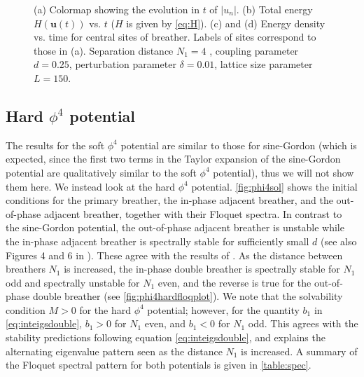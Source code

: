 \documentclass[12pt,reqno]{amsart}
\newcommand{\uvec}{\mathbf{u}}
\theoremstyle{definition}
\begin{document}
\begin{figure}
\begin{center}
\begin{subfigure}{0.45\linewidth}
		\label{fig:timestepSGpplongd}
	\end{subfigure}
	\end{center}
	\caption{(a) Colormap showing the evolution in $t$ of $|u_n|$. (b) Total energy $H(\uvec(t))$ vs. $t$ ($H$ is given by \cref{eq:H}). (c) and (d) Energy density vs. time for central sites of breather. Labels of sites correspond to those in (a). Separation distance $N_1 = 4$
	, coupling parameter $d=0.25$, perturbation parameter $\delta = 0.01$, lattice size parameter $L=150$.}
	\label{fig:timestepSGpplong}
\end{figure}

\subsection{Hard \texorpdfstring{$\phi^4$}{phi-4} potential}

The results for the soft $\phi^4$ potential are similar to those for sine-Gordon (which is expected, since the first two terms in the Taylor expansion of the sine-Gordon potential are qualitatively similar to the soft $\phi^4$ potential), thus we will not show them here. We instead look at the hard $\phi^4$ potential. \cref{fig:phi4sol} shows the initial conditions for the primary breather, the in-phase adjacent breather, and the out-of-phase adjacent breather, together with their Floquet spectra. In contrast to the sine-Gordon potential, the out-of-phase adjacent breather is unstable while the in-phase adjacent breather is spectrally stable for sufficiently small $d$ (see also Figures 4 and 6 in \cite{cuevas-maraver2016}). These agree with the results of \cites{Archilla2003,Koukouloyannis2009}. As the distance between breathers $N_1$ is increased, the in-phase double breather is spectrally stable for $N_1$ odd and spectrally unstable for $N_1$ even, and the reverse is true for the out-of-phase double breather (see \cref{fig:phi4hardfloqplot}). We note that the solvability condition $M > 0$ for the hard $\phi^4$ potential; however, for the quantity $b_1$ in \cref{eq:inteigsdouble}, $b_1 > 0$ for $N_1$ even, and $b_1 < 0$ for $N_1$ odd. This agrees with the stability predictions following equation \cref{eq:inteigsdouble}, and explains the alternating eigenvalue pattern seen as the distance $N_1$ is increased. A summary of the Floquet spectral pattern for both potentials is given in \cref{table:spec}.
\end{document}
